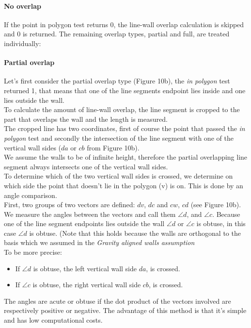 	\paragraph{No overlap}
	If the point in polygon test returns 0, the line-wall overlap calculation
	is skipped and 0 is returned. The remaining overlap types, partial and full,
	are treated individually:\\


	\paragraph{Partial overlap}
	Let's first consider the partial overlap type (Figure 10b), the \emph{in polygon} test
	returned 1, that means that one of the line segments endpoint lies inside
	and one lies outside the wall.\\
	To calculate the amount of line-wall overlap, the line segment is cropped to the
	part that overlaps the wall and the length is measured.\\
	The cropped line has two coordinates, first of course the point that passed
	the \emph{in polygon} test and secondly the intersection of the line
	segment with one of the vertical wall sides ($da$ or $cb$ from Figure 10b).\\
	We assume the walls to be of infinite height, therefore the 
	partial overlapping line segment always intersects one of the
	vertical wall sides.\\
	To determine which of the two vertical wall sides is crossed, we determine
	on which side the point that doesn't lie in the polygon (v) is on.  This is
	done by an angle comparison.\\
	First, two groups of two vectors are defined: $dv$, $dc$ and $cw$, $cd$ (see Figure 10b).
	We measure the angles between the vectors and call them $\angle d$, and
	$\angle c$. 
	Because one of the line segment endpoints lies outside
	the wall $\angle d$ or $\angle c$ is obtuse, in this case $\angle d$ is obtuse.
	(Note that this holds because the walls are orthogonal to the basis
	which we assumed in the \emph{Gravity aligned walls assumption}\\
	To be more precise: 
	\begin{itemize}
	\item If $\angle d$ is obtuse, the left vertical wall side $da$, is
	crossed. \\
	\item If $\angle c$ is obtuse, the right vertical wall side $cb$, is
	crossed. \\
	\end{itemize}
	The angles are acute or obtuse if the dot product of the vectors involved
	are respectively positive or negative. The advantage of this method is that
	it's simple and has low computational costs.\\
	
